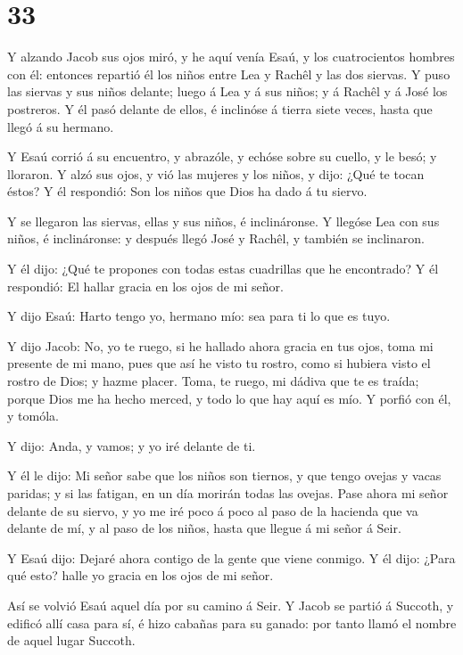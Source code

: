 \hypertarget{section-32}{%
\section{33}\label{section-32}}

 Y alzando Jacob sus ojos miró, y he aquí venía Esaú, y los
cuatrocientos hombres con él: entonces repartió él los niños entre Lea y
Rachêl y las dos siervas.  Y puso las siervas y sus niños
delante; luego á Lea y á sus niños; y á Rachêl y á José los postreros.
 Y él pasó delante de ellos, é inclinóse á tierra siete
veces, hasta que llegó á su hermano.

 Y Esaú corrió á su encuentro, y abrazóle, y echóse sobre su
cuello, y le besó; y lloraron.  Y alzó sus ojos, y vió las
mujeres y los niños, y dijo: ¿Qué te tocan éstos? Y él respondió: Son
los niños que Dios ha dado á tu siervo.

 Y se llegaron las siervas, ellas y sus niños, é
inclináronse.  Y llegóse Lea con sus niños, é inclináronse:
y después llegó José y Rachêl, y también se inclinaron.

 Y él dijo: ¿Qué te propones con todas estas cuadrillas que
he encontrado? Y él respondió: El hallar gracia en los ojos de mi señor.

 Y dijo Esaú: Harto tengo yo, hermano mío: sea para ti lo
que es tuyo.

 Y dijo Jacob: No, yo te ruego, si he hallado ahora gracia
en tus ojos, toma mi presente de mi mano, pues que así he visto tu
rostro, como si hubiera visto el rostro de Dios; y hazme placer.
 Toma, te ruego, mi dádiva que te es traída; porque Dios me
ha hecho merced, y todo lo que hay aquí es mío. Y porfió con él, y
tomóla.

 Y dijo: Anda, y vamos; y yo iré delante de ti.

 Y él le dijo: Mi señor sabe que los niños son tiernos, y
que tengo ovejas y vacas paridas; y si las fatigan, en un día morirán
todas las ovejas.  Pase ahora mi señor delante de su
siervo, y yo me iré poco á poco al paso de la hacienda que va delante de
mí, y al paso de los niños, hasta que llegue á mi señor á Seir.

 Y Esaú dijo: Dejaré ahora contigo de la gente que viene
conmigo. Y él dijo: ¿Para qué esto? halle yo gracia en los ojos de mi
señor.

 Así se volvió Esaú aquel día por su camino á Seir.
 Y Jacob se partió á Succoth, y edificó allí casa para sí,
é hizo cabañas para su ganado: por tanto llamó el nombre de aquel lugar
Succoth.

